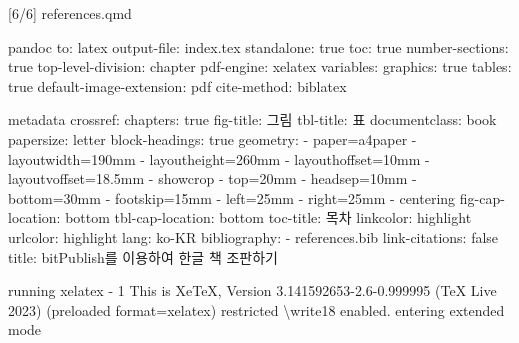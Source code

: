 \documentclass[
  letterpaper,
]{book}
\newenvironment{Shaded}{\begin{snugshade}}{\end{snugshade}}
\newcommand{\AttributeTok}[1]{\textcolor[rgb]{0.40,0.45,0.13}{#1}}
\newcommand{\DataTypeTok}[1]{\textcolor[rgb]{0.68,0.00,0.00}{#1}}
\newcommand{\ErrorTok}[1]{\textcolor[rgb]{0.68,0.00,0.00}{#1}}
\newcommand{\ExtensionTok}[1]{\textcolor[rgb]{0.00,0.23,0.31}{#1}}
\newcommand{\KeywordTok}[1]{\textcolor[rgb]{0.00,0.23,0.31}{#1}}
\newcommand{\NormalTok}[1]{\textcolor[rgb]{0.00,0.23,0.31}{#1}}
\begin{document}
\begin{Shaded}
\begin{Highlighting}[]
\ExtensionTok{[6/6]}\NormalTok{ references.qmd}

\ExtensionTok{pandoc}
  \ExtensionTok{to:}\NormalTok{ latex}
  \ExtensionTok{output{-}file:}\NormalTok{ index.tex}
  \ExtensionTok{standalone:}\NormalTok{ true}
  \ExtensionTok{toc:}\NormalTok{ true}
  \ExtensionTok{number{-}sections:}\NormalTok{ true}
  \ExtensionTok{top{-}level{-}division:}\NormalTok{ chapter}
  \ExtensionTok{pdf{-}engine:}\NormalTok{ xelatex}
  \ExtensionTok{variables:}
    \ExtensionTok{graphics:}\NormalTok{ true}
    \ExtensionTok{tables:}\NormalTok{ true}
  \ExtensionTok{default{-}image{-}extension:}\NormalTok{ pdf}
  \ExtensionTok{cite{-}method:}\NormalTok{ biblatex}

\ExtensionTok{metadata}
  \ExtensionTok{crossref:}
    \ExtensionTok{chapters:}\NormalTok{ true}
    \ExtensionTok{fig{-}title:}\NormalTok{ 그림}
    \ExtensionTok{tbl{-}title:}\NormalTok{ 표}
  \ExtensionTok{documentclass:}\NormalTok{ book}
  \ExtensionTok{papersize:}\NormalTok{ letter}
  \ExtensionTok{block{-}headings:}\NormalTok{ true}
  \ExtensionTok{geometry:}
    \ExtensionTok{{-}}\NormalTok{ paper=a4paper}
    \ExtensionTok{{-}}\NormalTok{ layoutwidth=190mm}
    \ExtensionTok{{-}}\NormalTok{ layoutheight=260mm}
    \ExtensionTok{{-}}\NormalTok{ layouthoffset=10mm}
    \ExtensionTok{{-}}\NormalTok{ layoutvoffset=18.5mm}
    \ExtensionTok{{-}}\NormalTok{ showcrop}
    \ExtensionTok{{-}}\NormalTok{ top=20mm}
    \ExtensionTok{{-}}\NormalTok{ headsep=10mm}
    \ExtensionTok{{-}}\NormalTok{ bottom=30mm}
    \ExtensionTok{{-}}\NormalTok{ footskip=15mm}
    \ExtensionTok{{-}}\NormalTok{ left=25mm}
    \ExtensionTok{{-}}\NormalTok{ right=25mm}
    \ExtensionTok{{-}}\NormalTok{ centering}
  \ExtensionTok{fig{-}cap{-}location:}\NormalTok{ bottom}
  \ExtensionTok{tbl{-}cap{-}location:}\NormalTok{ bottom}
  \ExtensionTok{toc{-}title:}\NormalTok{ 목차}
  \ExtensionTok{linkcolor:}\NormalTok{ highlight}
  \ExtensionTok{urlcolor:}\NormalTok{ highlight}
  \ExtensionTok{lang:}\NormalTok{ ko{-}KR}
  \ExtensionTok{bibliography:}
    \ExtensionTok{{-}}\NormalTok{ references.bib}
  \ExtensionTok{link{-}citations:}\NormalTok{ false}
  \ExtensionTok{title:}\NormalTok{ bitPublish를 이용하여 한글 책 조판하기}

\ExtensionTok{running}\NormalTok{ xelatex }\AttributeTok{{-}}\NormalTok{ 1}
  \ExtensionTok{This}\NormalTok{ is XeTeX, Version 3.141592653{-}2.6{-}0.999995 }\ErrorTok{(}\ExtensionTok{TeX}\NormalTok{ Live 2023}\KeywordTok{)} \KeywordTok{(}\ExtensionTok{preloaded}\NormalTok{ format=xelatex}\KeywordTok{)}
   \ExtensionTok{restricted} \DataTypeTok{\textbackslash{}w}\NormalTok{rite18 enabled.}
  \ExtensionTok{entering}\NormalTok{ extended mode}


\end{Highlighting}
\end{Shaded}
\end{document}
